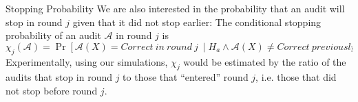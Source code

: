 \documentclass[final]{beamer}
\newlength{\colwidth}
\begin{document}
\begin{frame}[t]
\begin{columns}[t]
\begin{column}{\colwidth}
\begin{block}{Stopping Probability}
We are also interested in the probability that an audit will stop in round $j$ given that it did not stop earlier: 
The conditional stopping probability  of an audit $\mathcal{A}$ in round $j$ is 
$$\chi_j (\mathcal{A})=\Pr[\mathcal{A}(X)=Correct ~in~round~j~\mid H_a \land \mathcal{A}(X) \neq Correct ~previously]$$
Experimentally, using our simulations, $\chi_j$ would be estimated by the ratio of the audits that stop in round $j$ to those that ``entered'' round $j$, i.e. those that did not stop before round $j$. 
%
\begin{figure}[h]
\centering


\end{figure}
\end{block}
\end{column}
\end{columns}
\end{frame}
\end{document}
